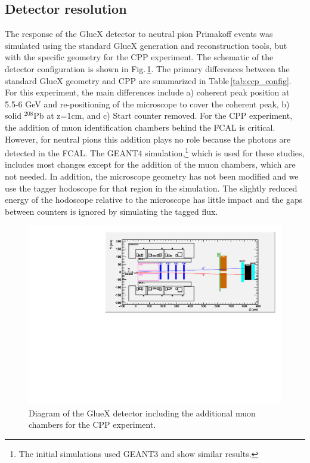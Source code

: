 \subsection{Detector resolution}
\label{sec:acceptance}
The response of the GlueX detector to neutral pion Primakoff events
was simulated using the standard GlueX generation and reconstruction
tools, but with the specific geometry for the CPP experiment. The schematic of the detector configuration is shown in
Fig.\,\ref{fig:GlueX_cpp}. The primary differences between the
standard GlueX geometry and CPP are summarized in
Table\,\ref{tab:ccp_config}. For this experiment, the main differences
include a) coherent peak position at 5.5-6 GeV and re-positioning of
the microscope to cover the coherent peak, b) solid $^{208}$Pb at
z=1cm, and c) Start counter removed. For the CPP experiment, the
addition of muon identification chambers behind the FCAL is
critical. However, for neutral pions this addition plays no role
because the photons are detected in the FCAL. The GEANT4 simulation,\footnote{The initial simulations used GEANT3
and show similar results.}
which is used for these studies, includes most changes except for the
addition of the muon chambers, which are not needed. In addition, the
microscope geometry has not been modified and we use the tagger
hodoscope for that region in the simulation. The slightly reduced
energy of the hodoscope relative to the microscope has little impact
and the gaps between counters is ignored by simulating the tagged
flux.
\begin{figure}[h!]
\centering
\includegraphics[width=5.25in]{figures/GlueX_cpp.pdf}
\caption{Diagram of the GlueX detector including the additional muon chambers for the CPP experiment.}
\label{fig:GlueX_cpp}
\end{figure}

